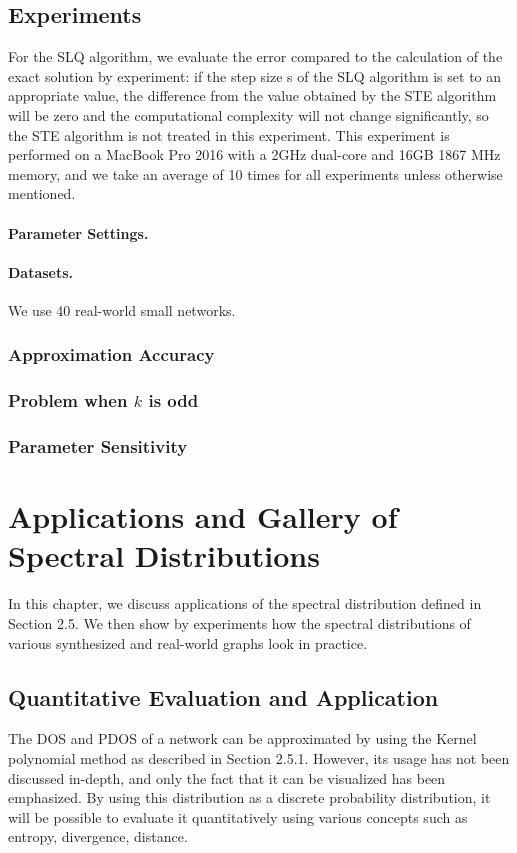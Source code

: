 \documentclass[senior,final,11pt]{iscs-thesis}
\begin{document}
\section{Experiments}
For the SLQ algorithm, we evaluate the error compared to the calculation of the exact solution by experiment: if the step size s of the SLQ algorithm is set to an appropriate value, the difference from the value obtained by the STE algorithm will be zero and the computational complexity will not change significantly, so the STE algorithm is not treated in this experiment. This experiment is performed on a MacBook Pro 2016 with a 2GHz dual-core and 16GB 1867 MHz memory, and we take an average of 10 times for all experiments unless otherwise mentioned.

\subsubsection*{Parameter Settings.}

\subsubsection*{Datasets.} We use 40 real-world small networks\cite{nr}.


\subsection{Approximation Accuracy}

\subsection{Problem when $k$ is odd}

\subsection{Parameter Sensitivity}




\chapter{Applications and Gallery of Spectral Distributions}
In this chapter, we discuss applications of the spectral distribution defined in Section 2.5. We then show by experiments how the spectral distributions of various synthesized and real-world graphs look in practice.

\section{Quantitative Evaluation and Application}
The DOS and PDOS of a network can be approximated by using the Kernel polynomial method as described in Section 2.5.1. However, its usage has not been discussed in-depth, and only the fact that it can be visualized has been emphasized.
By using this distribution as a discrete probability distribution, it will be possible to evaluate it quantitatively using various concepts such as entropy, divergence, distance.
\end{document}

